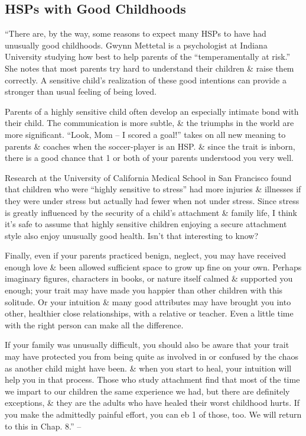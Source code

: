 \documentclass{article}
\numberwithin{equation}{section}
\begin{document}
\subsection{HSPs with Good Childhoods}
``There are, by the way, some reasons to expect many HSPs to have had unusually good childhoods. Gwynn Mettetal is a psychologist at Indiana University studying how best to help parents of the ``temperamentally at risk.'' She notes that most parents try hard to understand their children \& raise them correctly. A sensitive child's realization of these good intentions can provide a stronger than usual feeling of being loved.

Parents of a highly sensitive child often develop an especially intimate bond with their child. The communication is more subtle, \& the triumphs in the world are more significant. ``Look, Mom -- I scored a goal!'' takes on all new meaning to parents \& coaches when the soccer-player is an HSP. \& since the trait is inborn, there is a good chance that 1 or both of your parents understood you very well.

Research at the University of California Medical School in San Francisco found that children who were ``highly sensitive to stress'' had more injuries \& illnesses if they were under stress but actually had fewer when not under stress. Since stress is greatly influenced by the security of a child's attachment \& family life, I think it's safe to assume that highly sensitive children enjoying a secure attachment style also enjoy unusually good health. Isn't that interesting to know?

Finally, even if your parents practiced benign, neglect, you may have received enough love \& been allowed sufficient space to grow up fine on your own. Perhaps imaginary figures, characters in books, or nature itself calmed \& supported you enough; your trait may have made you happier than other children with this solitude. Or your intuition \& many good attributes may have brought you into other, healthier close relationships, with a relative or teacher. Even a little time with the right person can make all the difference.

If your family was unusually difficult, you should also be aware that your trait may have protected you from being quite as involved in or confused by the chaos as another child might have been. \& when you start to heal, your intuition will help you in that process. Those who study attachment find that most of the time we impart to our children the same experience we had, but there are definitely exceptions, \& they are the adults who have healed their worst childhood hurts. If you make the admittedly painful effort, you can eb 1 of those, too. We will return to this in Chap. 8.'' -- \cite[pp. 106--107]{Aron2013}
\end{document}
